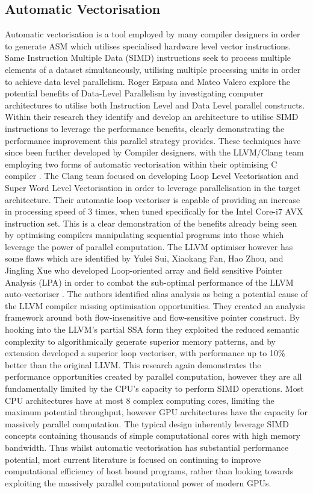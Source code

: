 \subsection{Automatic Vectorisation}
Automatic vectorisation is a tool employed by many compiler designers in order to generate ASM which
utilises specialised hardware level vector instructions.  Same Instruction Multiple Data (SIMD)
instructions seek to process multiple elements of a dataset simultaneously, utilising multiple
processing units in order to achieve data level parallelism. Roger Espasa and Mateo Valero
\cite{espasa1997exploiting} explore the potential benefits of Data-Level Parallelism by
investigating computer architectures to utilise both Instruction Level and Data Level parallel
constructs. Within their research they identify and develop an architecture to utilise SIMD
instructions to leverage the performance benefits, clearly demonstrating the performance improvement
this parallel strategy provides. These techniques have since been further developed by Compiler
designers, with the LLVM/Clang team employing two forms of automatic vectorisation within their
optimising C compiler \cite{website:llvmAutoVectorize}. The Clang team focused on developing Loop
Level Vectorisation and Super Word Level Vectorisation in order to leverage parallelisation in the
target architecture.  Their automatic loop vectoriser is capable of providing an increase in
processing speed of 3 times, when tuned specifically for the Intel Core-i7 AVX instruction set. This
is a clear demonstration of the benefits already being seen by optimising compilers manipulating
sequential programs into those which leverage the power of parallel computation. The LLVM optimiser
however has some flaws which are identified by Yulei Sui, Xiaokang Fan, Hao Zhou, and Jingling Xue
who developed Loop-oriented array and field sensitive Pointer Analysis (LPA) in order to combat the
sub-optimal performance of the LLVM auto-vectoriser \cite{sui2016loop}. The authors identified alias
analysis as being a potential cause of the LLVM compiler missing optimisation opportunities. They
created an analysis framework around both flow-insensitive and flow-sensitive pointer construct. By
hooking into the LLVM’s partial SSA form they exploited the reduced semantic complexity to
algorithmically generate superior memory patterns, and by extension developed a superior loop
vectoriser, with performance up to 10\% better than the original LLVM. This research again
demonstrates the performance opportunities created by parallel computation, however they are all
fundamentally limited by the CPU’s capacity to perform SIMD operations. Most CPU architectures have
at most 8 complex computing cores, limiting the maximum potential throughput, however GPU
architectures have the capacity for massively parallel computation. The typical design inherently
leverage SIMD concepts containing thousands of simple computational cores with high memory
bandwidth. Thus whilst automatic vectorisation has substantial performance potential, most current
literature is focused on continuing to improve computational efficiency of host bound programs,
rather than looking towards exploiting the massively parallel computational power of modern GPUs.

